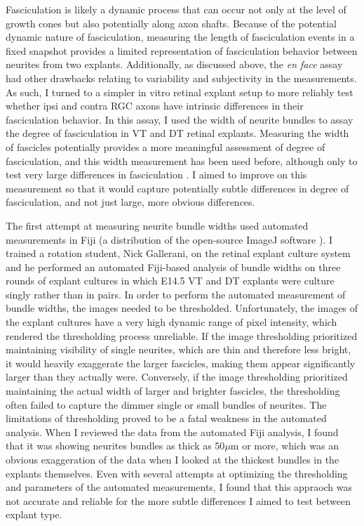 Fasciculation is likely a dynamic process that can occur not only at the level of growth cones but also potentially along axon shafts.
Because of the potential dynamic nature of fasciculation, measuring the length of fasciculation events in a fixed snapshot provides a limited representation of fasciculation behavior between neurites from two explants.
Additionally, as discussed above, the \emph{en face} assay had other drawbacks relating to variability and subjectivity in the measurements.
As such, I turned to a simpler in vitro retinal explant setup to more reliably test whether ipsi and contra RGC axons have intrinsic differences in their fasciculation behavior.
In this assay, I used the width of neurite bundles to assay the degree of fasciculation in VT and DT retinal explants.
Measuring the width of fascicles potentially provides a more meaningful assessment of degree of fasciculation, and this width measurement has been used before, although only to test very large differences in fasciculation \cite{jaworski2012autocrine}.
I aimed to improve on this measurement so that it would capture potentially subtle differences in degree of fasciculation, and not just large, more obvious differences.

The first attempt at measuring neurite bundle widths used automated measurements in Fiji (a distribution of the open-source ImageJ software \cite{schindelin2012fiji}).
I trained a rotation student, Nick Gallerani, on the retinal explant culture system and he performed an automated Fiji-based analysis of bundle widths on three rounds of explant cultures in which E14.5 VT and DT explants were culture singly rather than in pairs.
In order to perform the automated measurement of bundle widths, the images needed to be thresholded.
Unfortunately, the images of the explant cultures have a very high dynamic range of pixel intensity, which rendered the thresholding process unreliable.
If the image thresholding prioritized maintaining visibility of single neurites, which are thin and therefore less bright, it would heavily exaggerate the larger fascicles, making them appear significantly larger than they actually were.
Conversely, if the image thresholding prioritized maintaining the actual width of larger and brighter fascicles, the thresholding often failed to capture the dimmer single or small bundles of neurites.
The limitations of thresholding proved to be a fatal weakness in the automated analysis.
When I reviewed the data from the automated Fiji analysis, I found that it was showing neurites bundles as thick as 50$\mu$m or more, which was an obvious exaggeration of the data when I looked at the thickest bundles in the explants themselves.
Even with several attempts at optimizing the thresholding and parameters of the automated measurements, I found that this appraoch was not accurate and reliable for the more subtle differences I aimed to test between explant type.

